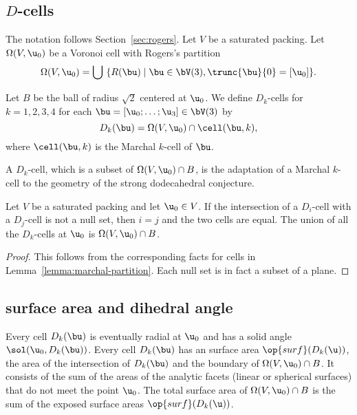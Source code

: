 \subsection{$D$-cells}



The notation follows Section~\ref{sec:rogers}.  Let $V$ be a saturated
packing. 
Let $\Omega( V,\u_0)$ be a Voronoi cell with  Rogers's partition 
\[
\Omega(V, \u_0) = \bigcup \ \{ R( \bu) \mid { \bu\in  \bV(3), \trunc{\bu}{0}= [\u_0] }\}.
\]
%
%

\begin{definition}[$B$,~$D_k$-cell]
  Let $B$ be the ball of radius $\sqrt2$ centered at
  $\u_0$.  We define $D_k$-cells for $k=1,2,3,4$ for each $
  \bu=[\u_0;\ldots;\u_3]\in \bV(3)$ by
\[
D_k(\bu) = \Omega(V,\u_0)\cap \cell(\bu,k),
\]
where $\cell(\bu,k)$ is the  Marchal $k$-cell of $\bu$.
\end{definition}
%
%
%


A $D_k$-cell, which is a subset of
$\Omega(V,\u_0)\cap B$, is the adaptation of a Marchal $k$-cell to the
geometry of the strong dodecahedral conjecture.  

\begin{lemma}[]
  Let $V$ be a saturated packing and let $\u_0\in V$.  If the intersection
of a $D_i$-cell with a $D_j$-cell is not a null set, then $i=j$ and the two
cells are equal.   The union
  of all the $D_k$-cells at $\u_0$ is $\Omega(V, \u_0)\cap B$.
\end{lemma}
%

\begin{proof} This follows from the corresponding facts for cells in
  Lemma~\ref{lemma:marchal-partition}.  Each null set is in fact a subset
  of a plane.
\end{proof}


\subsection{surface area and dihedral angle}

Every cell $D_k(\bu)$ is eventually radial at $ \u_0$ and has a
solid angle $\sol(\u_0,D_k(\bu))$.  Every cell $D_k(\bu)$ has
an  surface area $\op{surf}(D_k(\u))$, the area of
the intersection of $D_k(\bu)$ and the boundary of $\Omega(V,
\u_0)\cap B$.  It consists of the sum of the areas of the analytic
facets (linear or spherical surfaces) that do not meet the point $
\u_0$.  The total surface area of $\Omega(V,\u_0) \cap B$ is the sum of the
exposed surface areas $\op{surf}(D_k(\u))$.  %

